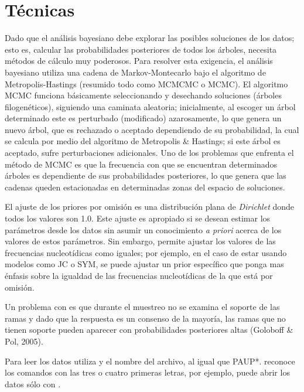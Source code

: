 \section*{T\'ecnicas}
Dado que el an\'alisis bayesiano debe explorar las posibles soluciones de los datos; esto es, calcular las probabilidades posteriores de todos los \'arboles, necesita m\'etodos de c\'alculo muy poderosos. Para resolver esta exigencia, el an\'alisis bayesiano utiliza una cadena de Markov-Montecarlo bajo el algoritmo de
Metropolis-Hastings (resumido todo como MCMCMC o MCMC). El algoritmo MCMC funciona b\'asicamente seleccionando y desechando 
soluciones (\'arboles filogen\'eticos), siguiendo una caminata aleatoria; 
inicialmente, al escoger un \'arbol determinado este es perturbado (modificado)
azarosamente, lo que genera un nuevo \'arbol, que es rechazado o aceptado dependiendo de su probabilidad, la cual se calcula por medio del algoritmo de Metropolis \& Hastings; si este \'arbol es aceptado, sufre perturbaciones adicionales. Uno de los problemas que enfrenta el m\'etodo de MCMC es que la frecuencia con que se encuentran  determinados \'arboles es dependiente de sus probabilidades posteriores, lo que genera que las cadenas queden estacionadas en determinadas zonas del espacio de soluciones.

El ajuste de los priores por omisi\'on es una distribuci\'on plana de \textit{Dirichlet} donde todos los valores son 1.0. Este ajuste es apropiado si se desean estimar los par\'ametros desde los datos sin asumir un conocimiento \textit{a priori} acerca de los valores de estos par\'ametros. Sin embargo,   permite ajustar los valores de las frecuencias nucleot\'idicas como iguales; por ejemplo, en el caso de estar usando modelos como JC o SYM, se puede ajustar un prior espec\'ifico que ponga mas \'enfasis sobre la igualdad de las frecuencias nucleot\'idicas de la que est\'a por omisi\'on.

Un problema con  es que durante el muestreo no se examina el soporte de las ramas y dado que la respuesta es un consenso de la mayor\'ia, las ramas que no tienen soporte pueden aparecer con probabilidades posteriores altas (Goloboff \& Pol, 2005).


Para leer los datos  utiliza  y el nombre del archivo, al igual que {PAUP*}.  reconoce los comandos con las tres o cuatro primeras letras, por ejemplo, puede abrir los datos s\'olo con .


